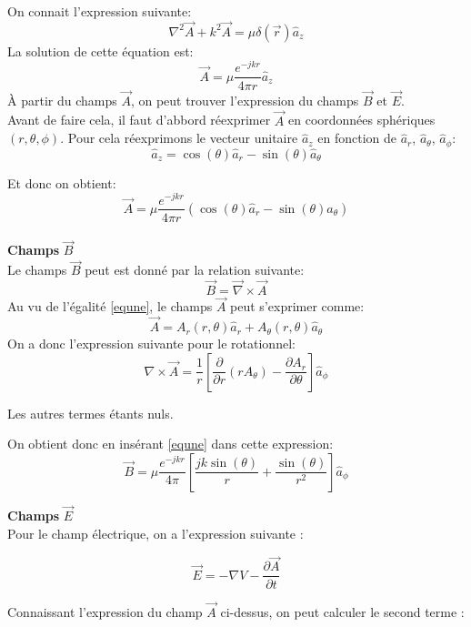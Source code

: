 \documentclass[10pt,a4paper]{article}
\newcommand{\PDeriv}[2]{\frac{\partial#1}{\partial#2}} %
\newcommand{\V}[1]{\overrightarrow{#1}}
\begin{document}
On connait l'expression suivante:
$$\nabla^2 \overrightarrow{A}+k^2 \overrightarrow{A}=\mu \delta (\overrightarrow{r}) \widehat{a}_z$$
La solution de cette équation est:
$$\overrightarrow{A}=\mu \dfrac{e^{-jkr}}{4\pi r}\widehat{a}_z$$
À partir du champs $\overrightarrow{A}$, on peut trouver l'expression du champs $\overrightarrow{B}$ et $\overrightarrow{E}$.\\
Avant de faire cela, il faut d'abbord réexprimer $\overrightarrow{A}$ en coordonnées sphériques $(r,\theta , \phi)$. Pour cela réexprimons le vecteur unitaire $\widehat{a}_z$ en fonction de $\widehat{a}_r$, $\widehat{a}_\theta$, $\widehat{a}_\phi$:
$$\widehat{a}_z=\cos(\theta)\widehat{a}_r-\sin(\theta)\widehat{a}_\theta$$

Et donc on obtient:
\begin{equation}\label{equne}
\overrightarrow{A}=\mu \dfrac{e^{-jkr}}{4\pi r} (\cos(\theta)\widehat{a}_r-\sin(\theta)\widehat{a}_\theta)
\end{equation}
\\

\indent \textbf{Champs} $\overrightarrow{B}$\\
Le champs $\overrightarrow{B}$ peut est donné par la relation suivante:
$$\overrightarrow{B}=\overrightarrow{\nabla}\times \overrightarrow{A}$$
Au vu de l'égalité \ref{equne}, le champs $\overrightarrow{A}$ peut s'exprimer comme:
$$\overrightarrow{A}=A_{r}(r,\theta)\widehat{a}_r+A_{\theta}(r,\theta)\widehat{a}_\theta$$
On a donc l'expression suivante pour le rotationnel:
$$\nabla \times \overrightarrow{A}= \dfrac{1}{r} \left[ \dfrac{\partial}{\partial r} (r A_{\theta}) - \dfrac{\partial A_r}{\partial \theta} \right]\widehat{a}_{\phi}$$

Les autres termes étants nuls.

On obtient donc en insérant \ref{equne} dans cette expression:
$$\overrightarrow{B}= \mu\dfrac{e^{-jkr}}{4\pi} \left[ \dfrac{jk \sin (\theta )}{r} + \dfrac{\sin (\theta )}{r^2} \right]\widehat{a}_{\phi} $$


\indent \textbf{Champs} $\overrightarrow{E}$\\

Pour le champ électrique, on a l'expression suivante : 

\begin{equation}
\overrightarrow{E} = - \nabla V - \PDeriv{\overrightarrow{A}}{t}
\end{equation}

Connaissant l'expression du champ $\V{A}$ ci-dessus, on peut calculer le second terme :
\end{document}
